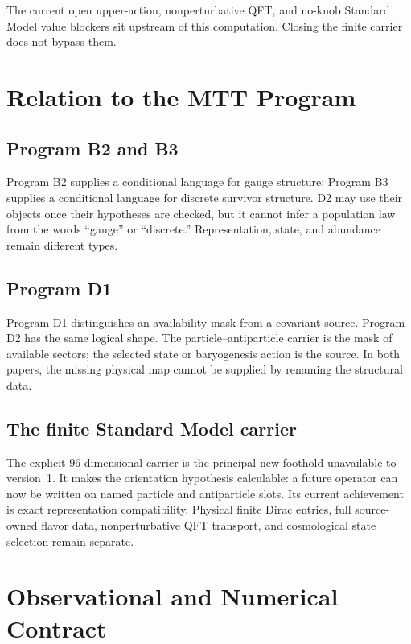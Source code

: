 \documentclass[11pt]{article}
\theoremstyle{definition}
\theoremstyle{remark}
\begin{document}
The current open upper-action, nonperturbative QFT, and no-knob Standard Model
value blockers sit upstream of this computation.  Closing the finite carrier
does not bypass them.

\section{Relation to the MTT Program}

\subsection{Program B2 and B3}

Program B2 supplies a conditional language for gauge structure; Program B3
supplies a conditional language for discrete survivor structure.  D2 may use
their objects once their hypotheses are checked, but it cannot infer a
population law from the words ``gauge'' or ``discrete.''  Representation,
state, and abundance remain different types.

\subsection{Program D1}

Program D1 distinguishes an availability mask from a covariant source.
Program D2 has the same logical shape.  The particle--antiparticle carrier is
the mask of available sectors; the selected state or baryogenesis action is
the source.  In both papers, the missing physical map cannot be supplied by
renaming the structural data.

\subsection{The finite Standard Model carrier}

The explicit 96-dimensional carrier is the principal new foothold unavailable
to version~1.  It makes the orientation hypothesis calculable: a future
operator can now be written on named particle and antiparticle slots.  Its
current achievement is exact representation compatibility.  Physical finite
Dirac entries, full source-owned flavor data, nonperturbative QFT transport,
and cosmological state selection remain separate.

\section{Observational and Numerical Contract}
\end{document}

